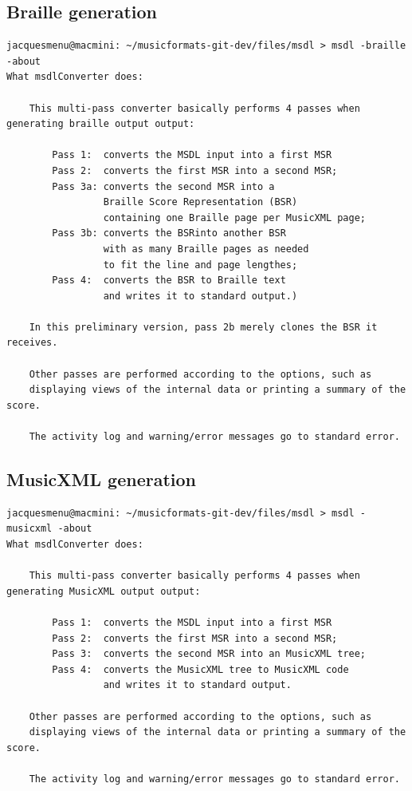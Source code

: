 \subsection{Braille generation}

\begin{lstlisting}[language=Terminal]
jacquesmenu@macmini: ~/musicformats-git-dev/files/msdl > msdl -braille -about
What msdlConverter does:

    This multi-pass converter basically performs 4 passes when generating braille output output:

        Pass 1:  converts the MSDL input into a first MSR
        Pass 2:  converts the first MSR into a second MSR;
        Pass 3a: converts the second MSR into a
                 Braille Score Representation (BSR)
                 containing one Braille page per MusicXML page;
        Pass 3b: converts the BSRinto another BSR
                 with as many Braille pages as needed
                 to fit the line and page lengthes;
        Pass 4:  converts the BSR to Braille text
                 and writes it to standard output.)

    In this preliminary version, pass 2b merely clones the BSR it receives.

    Other passes are performed according to the options, such as
    displaying views of the internal data or printing a summary of the score.

    The activity log and warning/error messages go to standard error.
\end{lstlisting}

\subsection{MusicXML generation}

\begin{lstlisting}[language=Terminal]
jacquesmenu@macmini: ~/musicformats-git-dev/files/msdl > msdl -musicxml -about
What msdlConverter does:

    This multi-pass converter basically performs 4 passes when generating MusicXML output output:

        Pass 1:  converts the MSDL input into a first MSR
        Pass 2:  converts the first MSR into a second MSR;
        Pass 3:  converts the second MSR into an MusicXML tree;
        Pass 4:  converts the MusicXML tree to MusicXML code
                 and writes it to standard output.

    Other passes are performed according to the options, such as
    displaying views of the internal data or printing a summary of the score.

    The activity log and warning/error messages go to standard error.

\end{lstlisting}

